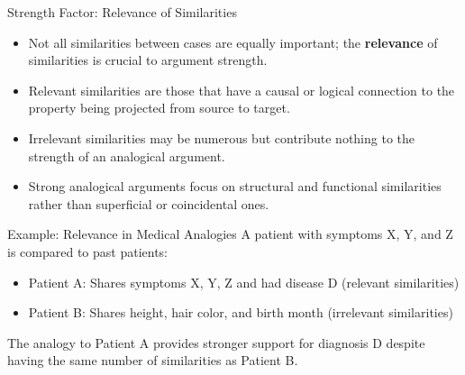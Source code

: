 \documentclass{beamer}
\begin{document}
	\begin{frame}{Strength Factor: Relevance of Similarities}
		\begin{itemize}
			\item Not all similarities between cases are equally important; the \textbf{relevance} of similarities is crucial to argument strength.
			\item Relevant similarities are those that have a causal or logical connection to the property being projected from source to target.
			\item Irrelevant similarities may be numerous but contribute nothing to the strength of an analogical argument.
			\item Strong analogical arguments focus on structural and functional similarities rather than superficial or coincidental ones.
		\end{itemize}
		
		\begin{exampleblock}{Example: Relevance in Medical Analogies}
			\scriptsize
			A patient with symptoms X, Y, and Z is compared to past patients:
			\begin{itemize}
				\item Patient A: Shares symptoms X, Y, Z and had disease D (relevant similarities)
				\item Patient B: Shares height, hair color, and birth month (irrelevant similarities)
			\end{itemize}
			The analogy to Patient A provides stronger support for diagnosis D despite having the same number of similarities as Patient B.
		\end{exampleblock}
	\end{frame}
	
\end{document}
